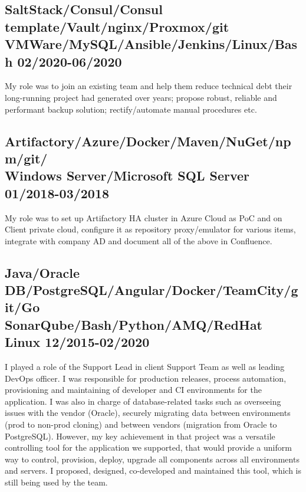 \documentclass[%
               doublesided,
               paper=a4,
               fontsize=10pt
              ]{my-resume}
\begin{document}
{    \subsection{SaltStack/Consul/Consul template/Vault/nginx/Proxmox/git\\
    VMWare/MySQL/Ansible/Jenkins/Linux/Bash {\small 02/2020-06/2020}}
    My role was to join an existing team and help them reduce technical debt
    their long-running project had generated over years; propose robust,
    reliable and performant backup solution; rectify/automate manual procedures etc.
    \vspace{0.5em}
        
    \subsection{Artifactory/Azure/Docker/Maven/NuGet/npm/git/\\
    Windows Server/Microsoft SQL Server {\small 01/2018-03/2018}}
    My role was to set up Artifactory HA cluster in Azure Cloud as PoC and on Client
    private cloud, configure it as repository proxy/emulator for various items,
    integrate with company AD and document all of the above in Confluence.
    \vspace{0.5em}
    
    \subsection{Java/Oracle DB/PostgreSQL/Angular/Docker/TeamCity/git/Go\\
    SonarQube/Bash/Python/AMQ/RedHat Linux {\small 12/2015-02/2020}}
    I played a role of the Support Lead in client Support Team as well as leading
    DevOps officer.  I was responsible for production releases, process automation,
    provisioning and maintaining of developer and CI environments for the
    application.  I was also in charge of database-related tasks such as overseeing
    issues with the vendor (Oracle), securely migrating data between
    environments (prod to non-prod cloning) and between vendors (migration from
    Oracle to PostgreSQL).  However, my key achievement in that project was a
    versatile controlling tool for the application we supported, that would provide
    a uniform way to control, provision, deploy, upgrade all components across all
    environments and servers.  I proposed, designed, co-developed and maintained
    this tool, which is still being used by the team.
    \vspace{0.5em}
    
}
\end{document}
